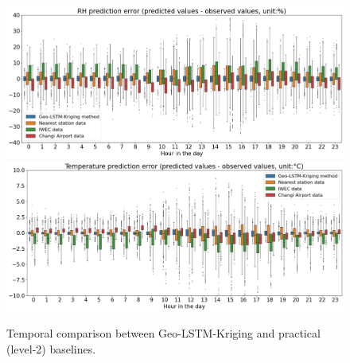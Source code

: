 \documentclass[a4paper,fleqn]{cas-sc}
\begin{document}
\begin{figure}[!h]
	\centering
	\includegraphics[scale=0.38]{figs/new_figs/RHrk_ne_airport.png}
    \includegraphics[scale=0.38]{figs/new_figs/TEMrk_ne_airport.png}
	\caption{Temporal comparison between Geo-LSTM-Kriging and practical (level-2) baselines.}
	\label{FIG:baselines2}
\end{figure}
\end{document}
